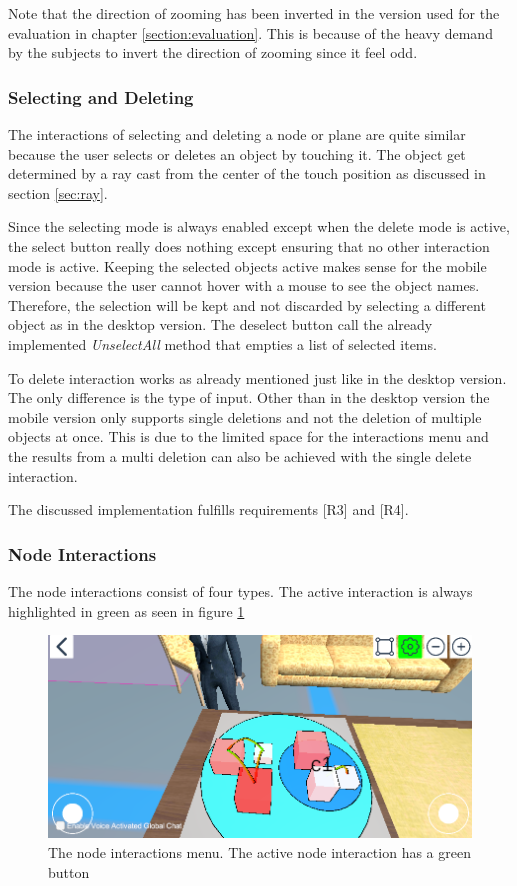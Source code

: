 Note that the direction of zooming has been inverted in the version used for the evaluation in chapter \ref{section:evaluation}.
This is because of the heavy demand by the subjects to invert the direction of zooming since it feel odd.

\subsubsection{Selecting and Deleting}
The interactions of selecting and deleting a \gls{node} or \gls{plane} are quite similar because the user selects or deletes an object by touching it.
The object get determined by a ray cast from the center of the touch position as discussed in section \ref{sec:ray}.

Since the selecting mode is always enabled except when the delete mode is active, the select button really does nothing except ensuring that no other interaction mode is active.
Keeping the selected objects active makes sense for the mobile version because the user cannot hover with a mouse to see the object names.
Therefore, the selection will be kept and not discarded by selecting a different object as in the desktop version.
The deselect button call the already implemented \textit{UnselectAll} method that empties a list of selected items.

To delete interaction works as already mentioned just like in the desktop version. 
The only difference is the type of input. 
Other than in the desktop version the mobile version only supports single deletions and not the deletion of multiple objects at once.
This is due to the limited space for the interactions menu and the results from a multi deletion can also be achieved with the single delete interaction.

The discussed implementation fulfills requirements [R3] and [R4].
\subsubsection{Node Interactions}
The node interactions consist of four types.
The active interaction is always highlighted in green as seen in figure \ref{fig:node}
\begin{figure}[htb]
    \centering
    \includegraphics[width=1\textwidth]{Implementation/img/node.png}
    \caption{The node interactions menu. The active node interaction has a green button}\label{fig:node}
\end{figure}

